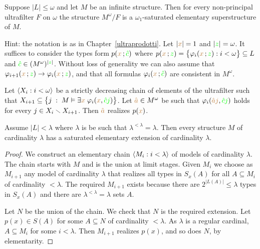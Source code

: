 \documentclass[creche.tex]{subfiles}
\begin{document}
\begin{exercise}
Suppose $|L|\le\omega$ and let $M$ be an infinite structure. Then for every non-principal ultrafilter $F$ on $\omega$ the structure $M^\omega/F$ is a $\omega_1$-saturated elementary superstructure of $M$.

Hint: the notation is as in Chapter~\ref{ultraprodotti}. Let $|{\color{brown} x}|=1$ and 
$|{\color{green} z}|=\omega$. It suffices to consider the types form $p({\color{brown} x}\,;{\color{green}\hat c})$ where $p({\color{brown} x}\,;{\color{green} z})=\big\{\varphi_i({\color{brown} x}\,;{\color{green} z}):i<\omega\big\}\subseteq L$ and ${\color{green}\hat c}\in(M^\omega)^{|{\color{green} z}|}$. Without loss of generality we can also assume that $\varphi_{i+1}({\color{brown} x}\,;{\color{green} z})\rightarrow\varphi_i({\color{brown} x}\,;{\color{green} z})$, and that all formulas $\varphi_i({\color{brown} x}\,;{\color{green}\hat c})$ are consistent in $M^\omega$. 

Let $\langle X_i:i<\omega\rangle$ be a strictly decreasing chain of elements of the ultrafilter such that  $X_{i+1}\subseteq\big\{j\;:\;M\vDash\exists{\color{brown}x}\;\varphi_i({\color{brown} x},{\color{green}\hat cj})\big\}$. Let ${\color{brown}\hat a}\in M^\omega$ be such that  $\varphi_i({\color{brown}\hat aj},{\color{green}\hat cj})$ holds for every $j\in X_i\smallsetminus X_{i+1}$. Then ${\color{brown}\hat a}$ realizes $p({\color{brown} x})$.\QED
\end{exercise}


\begin{theorem}\label{thm_esistenza_staturo_card_inacc}
Assume $|L|<\lambda$ where $\lambda$ is be such that $\lambda^{<\lambda}=\lambda$. Then every structure $M$ of cardinality $\lambda$ has a saturated elementary extension of cardinality $\lambda$.
\end{theorem}

\begin{proof}
We construct an elementary chain $\langle M_i : i<\lambda\rangle$ of models of cardinality $\lambda$. The chain starts with $M$ and is the union at limit stages. Given $M_i$ we choose as $M_{i+1}$ any model of cardinality $\lambda$ that realizes all types in $S_x(A)$ for all $A\subseteq M_i$ of cardinality $<\lambda$. The required $M_{i+1}$ exists because there are $2^{|L(A)|}\le\lambda$ types in $S_x(A)$ and there are $\lambda^{<\lambda}=\lambda$ sets $A$.

Let $N$ be the union of the chain. We check that $N$ is the required extension. Let $p(x)\in S(A)$ for some $A\subseteq N$ of cardinality $<\lambda$. As $\lambda$ is a regular cardinal,  $A\subseteq M_i$ for some $i<\lambda$. Then $M_{i+1}$ realizes $p(x)$, and so does $N$, by elementarity.
\end{proof}
\end{document}
